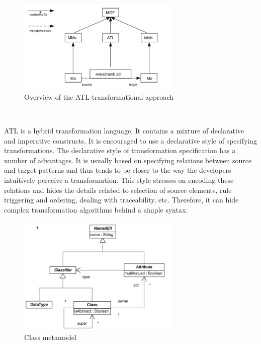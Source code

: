\documentclass{llncs}
\begin{document}
\begin{figure}
	\centering
	\includegraphics[width=0.7\textwidth,natwidth=610,natheight=642]{figures/Overview_ATL.jpg}
	\caption{Overview of the ATL transformational approach}
	\label{fig:overview_atl}
\end{figure}~\cite{atl:frederic}

ATL is a hybrid transformation language. It contains a mixture of declarative
and imperative constructs. It is encouraged to use a declarative style of specifying transformations. The declarative style of transformation specification has a number of advantages. It is usually based on specifying relations between source and target patterns and thus tends to be closer to the way the developers intuitively perceive a transformation. This style stresses on encoding these relations and hides the details related to selection of source elements, rule triggering and ordering, dealing with traceability, etc. Therefore, it can hide complex transformation algorithms behind a simple syntax.\cite{atl:frederic}

\begin{figure}
	\centering
	\includegraphics[width=0.7\textwidth,natwidth=610,natheight=642]{figures/Class_metamodel.jpg}
	\caption{Class metamodel}
	\label{fig:class_metamodel_atl}
\end{figure}~
\end{document}
